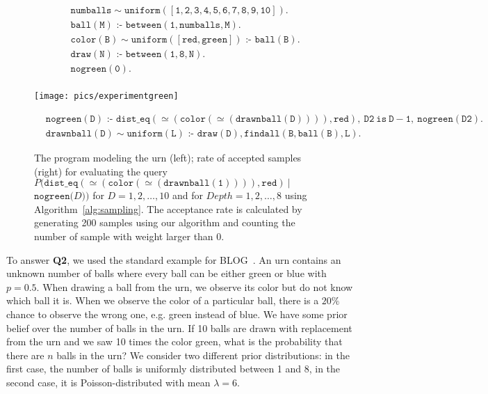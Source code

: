 \documentclass{tlp}
\newcommand{\coloneq}{\mbox{ :- }}
\begin{document}
\begin{figure}[ht]
  \centering
  \begin{minipage}{0.40\textwidth}
    \begin{align*}
      &{ }\\
      &{ }\\
      &{ }\\
      &\mathtt{numballs \sim uniform([1,2,3,4,5,6,7,8,9,10]).}\\
      &\mathtt{ball(M) \coloneq between(1,numballs,M).}\\
      &\mathtt{color(B)\sim uniform([red,green]) \coloneq ball(B).}\\
      &\mathtt{draw(N) \coloneq between(1,8,N).}\\
      &\mathtt{nogreen(0).}\\
    \end{align*}
  \end{minipage}
  \begin{minipage}{0.42\textwidth}
    \texttt{[image: pics/experimentgreen]}
  \end{minipage}
  \vspace{-0.5cm}
  \begin{align*}
    &\mathtt{nogreen(D) \coloneq
      dist\_eq(\simeq(color(\simeq(drawnball(D)))),red),\ D2\ is\
      D-1,\
      nogreen(D2).}\\
    &\mathtt{drawnball(D) \sim uniform(L) \coloneq
      draw(D),}\mathtt{findall(B,ball(B),L).}
  \end{align*}
  \caption{ The program modeling the urn (left); rate of accepted
    samples (right) for evaluating the query
    $P(\mathtt{dist\_eq(\simeq(color(\simeq(drawnball(1)))),red)}\ |$
    $\mathtt{nogreen(}D\mathtt{)})$ for $D=1,2,\ldots, 10$ and for
    $Depth=1,2,\ldots,8$ using Algorithm~\ref{alg:sampling}. The
    acceptance rate is calculated by generating 200 samples using our
    algorithm and counting the number of sample with weight larger
    than 0.}
  \label{fig:experimentnogreen}
\end{figure}

To answer \textbf{Q2}, we used the standard example for
BLOG~\cite{Milch05}.  An urn contains an unknown number of balls where
every ball can be either green or blue with $p=0.5$. When drawing a
ball from the urn, we observe its color but do not know which ball it
is.  When we observe the color of a particular ball, there is a $20\%$
chance to observe the wrong one, e.g. green instead of blue. We have
some prior belief over the number of balls in the urn. If 10 balls are
drawn with replacement from the urn and we saw 10 times the color
green, what is the probability that there are $n$ balls in the urn? We
consider two different prior distributions: in the first case, the
number of balls is uniformly distributed between 1 and 8, in the
second case, it is Poisson-distributed with mean $\lambda=6$.
\end{document}
